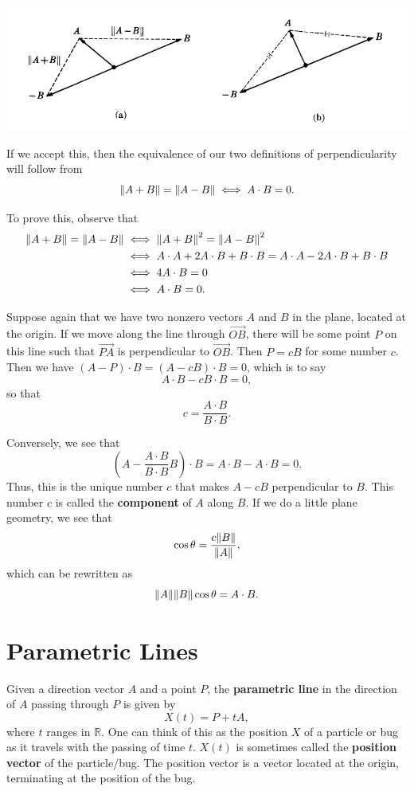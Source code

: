 \documentclass{article}
\begin{document}
\includegraphics[scale = 0.5]{perpendicular.PNG}

If we accept this, then the equivalence of our two definitions of perpendicularity will follow from 
\[\norm{A+B}=\norm{A-B} \iff A \cdot B = 0.\]

To prove this, observe that
\begin{align*}
    \norm{A+B}=\norm{A-B}&\iff \norm{A + B}^2 = \norm{A - B}^2\\
    &\iff A\cdot A + 2 A \cdot B + B \cdot B = A \cdot A - 2 A \cdot B + B \cdot B\\
    &\iff 4 A \cdot B = 0\\
    &\iff A \cdot B = 0.
\end{align*}

Suppose again that we have two nonzero vectors $A$ and $B$ in the plane, located at the origin.
If we move along the line through $\overrightarrow{OB}$, there will be some point $P$ on this line such
that $\overrightarrow{PA}$ is perpendicular to $\overrightarrow{OB}$. Then $P = c B$ for some number $c$.
Then we have $(A - P)\cdot B = (A - cB)\cdot B = 0$, which is to say
\[A \cdot B - c B \cdot B = 0,\]
so that
\[c = \frac{A \cdot B}{B \cdot B}.\]

Conversely, we see that
\[\left( A - \frac{A \cdot  B}{B \cdot B} B \right) \cdot B = A\cdot B - A \cdot B = 0.\]
Thus, this is the unique number $c$ that makes $A - cB$ perpendicular to $B$. This number $c$ is called
the \textbf{component} of $A$ along $B$. If we do a little plane geometry, we see that
\[\cos \theta = \frac{c \norm{B}}{\norm{A}},\]
which can be rewritten as 
\[\norm{A} \norm{B} \cos \theta = A \cdot B.\]

\section*{Parametric Lines}
Given a direction vector $A$ and a point $P$, the \textbf{parametric line}
in the direction of $A$ passing through $P$ is given by
\[X(t) = P + tA,\]
where $t$ ranges in $\mathbb{R}$. One can think of this as 
the position $X$ of a particle or bug as it travels with
the passing of time $t$. $X(t)$ is sometimes called the
\textbf{position vector} of the particle/bug. The position vector
is a vector located at the origin, terminating at the position of 
the bug. 
\end{document}
